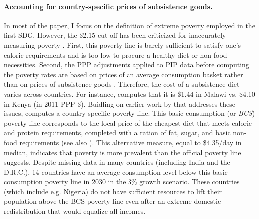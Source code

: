 \paragraph{Accounting for country-specific prices of subsistence goods.}
In most of the paper, I focus on the definition of extreme poverty employed in the first SDG. However, the \$2.15 cut-off has been criticized for inaccurately measuring poverty \citep{woodward_redefining_2010,deaton_price_2010,deaton_purchasing_2011}. %
First, this poverty line %
is barely sufficient to satisfy one's caloric requirements and is too low to procure a healthy diet or non-food necessities. 
Second, the PPP adjustments applied to PIP data before computing the poverty rates are based on prices of an average consumption basket rather than on prices of subsistence goods \citep{sullivan_capitalist_2023}. Therefore, the cost of a subsistence diet varies across countries. For instance, \cite{moatsos_global_2016} computes that it is \$1.44 in Malawi vs. \$4.10 in Kenya (in 2011 PPP \$). Buidling on earlier work by \cite{allen_absolute_2017} that addresses these issues, \cite{moatsos_global_2016} computes a country-specific poverty line. This basic consumption (or \textit{BCS}) poverty line corresponds to the local price of the cheapest diet that meets caloric and protein requirements, completed with a ration of fat, sugar, and basic non-food requirements (see also \citealp{moatsos_global_2021}). This alternative measure, equal to \$4.35/day in median, indicates that poverty %
is more prevalent than the official poverty line suggests. Despite missing data in many countries (including India and the D.R.C.), 14 countries have an average consumption level below this basic consumption poverty line in 2030 in the 3\% growth scenario. These countries (which include e.g. Nigeria) do not have sufficient resources to lift their population above the BCS poverty line even after an extreme domestic redistribution that would equalize all incomes. 

